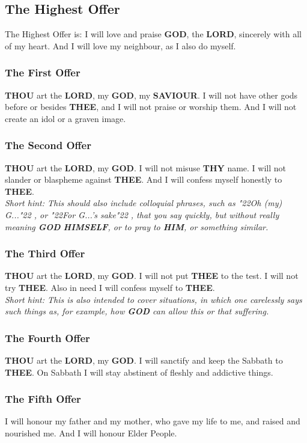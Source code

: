 \documentclass[12pt,a4paper]{article}
\newcommand{\God}[0]{\textbf{GOD}}
\newcommand{\Him}[0]{\textbf{HIM}}
\newcommand{\Himself}[0]{\textbf{HIMSELF}}
\newcommand{\Lord}[0]{\textbf{LORD}}
\newcommand{\Saviour}[0]{\textbf{SAVIOUR}}
\newcommand{\Thee}[0]{\textbf{THEE}}
\newcommand{\Thou}[0]{\textbf{THOU}}
\newcommand{\Thy}[0]{\textbf{THY}}
\newcommand{\q}[1]{\char"22{#1}\char"22 }
\begin{document}
	\subsection{The Highest Offer}
		The Highest Offer is:
		I will love and praise {\God},
		the {\Lord},
		sincerely with all of my heart.
		And I will love my neighbour,
		as I also do myself.
		
	\subsubsection{The First Offer}
		{\Thou} art the {\Lord},
		my {\God},
		my {\Saviour}.
		I will not have other gods before or besides {\Thee},
		and I will not praise or worship them.
		And I will not create an idol or a graven image.
		
	\subsubsection{The Second Offer}
		{\Thou} art the {\Lord},
		my {\God}.
		I will not misuse {\Thy} name.
		I will not slander or blaspheme against {\Thee}.
		And I will confess myself honestly to {\Thee}.
		\\
		\textit{Short hint:
		This should also include colloquial phrases,
		such as \q{Oh (my) G...},
		or \q{For G...'s sake},
		that you say quickly,
		but without really meaning {\God} {\Himself},
		or to pray to {\Him},
		or something similar.}
			
	\subsubsection{The Third Offer}
		{\Thou} art the {\Lord},
		my {\God}.
		I will not put {\Thee} to the test.
		I will not try {\Thee}.
		Also in need I will confess myself to {\Thee}.
		\\
		\textit{Short hint:
		This is also intended to cover situations,
		in which one carelessly says such things as,
		for example,
		how {\God} can allow this or that suffering.}
		
	\subsubsection{The Fourth Offer}
		{\Thou} art the {\Lord},
		my {\God}.
		I will sanctify and keep the Sabbath to {\Thee}.
		On Sabbath I will stay abstinent of fleshly
		and addictive things.
		
	\subsubsection{The Fifth Offer}
		I will honour my father and my mother,
		who gave my life to me,
		and raised and nourished me.
		And I will honour Elder People.
			
\end{document}
